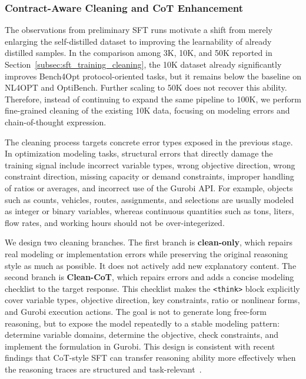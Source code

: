 \subsubsection{Contract-Aware Cleaning and CoT Enhancement}
\label{subsec:sft_cot_cleaning}

The observations from preliminary SFT runs motivate a shift from merely enlarging the self-distilled dataset to improving the learnability of already distilled samples. In the comparison among 3K, 10K, and 50K reported in Section~\ref{subsec:sft_training_cleaning}, the 10K dataset already significantly improves Bench4Opt protocol-oriented tasks, but it remains below the baseline on NL4OPT and OptiBench. Further scaling to 50K does not recover this ability. Therefore, instead of continuing to expand the same pipeline to 100K, we perform fine-grained cleaning of the existing 10K data, focusing on modeling errors and chain-of-thought expression.

The cleaning process targets concrete error types exposed in the previous stage. In optimization modeling tasks, structural errors that directly damage the training signal include incorrect variable types, wrong objective direction, wrong constraint direction, missing capacity or demand constraints, improper handling of ratios or averages, and incorrect use of the Gurobi API. For example, objects such as counts, vehicles, routes, assignments, and selections are usually modeled as integer or binary variables, whereas continuous quantities such as tons, liters, flow rates, and working hours should not be over-integerized.

We design two cleaning branches. The first branch is \textbf{clean-only}, which repairs real modeling or implementation errors while preserving the original reasoning style as much as possible. It does not actively add new explanatory content. The second branch is \textbf{Clean-CoT}, which repairs errors and adds a concise modeling checklist to the target response. This checklist makes the \texttt{<think>} block explicitly cover variable types, objective direction, key constraints, ratio or nonlinear forms, and Gurobi execution actions. The goal is not to generate long free-form reasoning, but to expose the model repeatedly to a stable modeling pattern: determine variable domains, determine the objective, check constraints, and implement the formulation in Gurobi. This design is consistent with recent findings that CoT-style SFT can transfer reasoning ability more effectively when the reasoning traces are structured and task-relevant~\citep{yu2025long,lin2025facilitating,yeo2025demystifying}.

